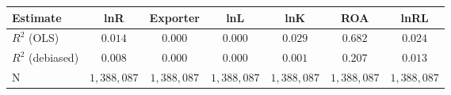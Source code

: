 \begin{tabular}{l*{6}{c}}
\hline\hline
 Estimate & lnR & Exporter & lnL & lnK & ROA & lnRL \\
\hline
\addlinespace $ R^2$ (OLS) & $0.014$ & $0.000$ & $0.000$ & $0.029$ & $0.682$ & $0.024$ \\
$ R^2$ (debiased) & $0.008$ & $0.000$ & $0.000$ & $0.001$ & $0.207$ & $0.013$ \\
N & $1,388,087$ & $1,388,087$ & $1,388,087$ & $1,388,087$ & $1,388,087$ & $1,388,087$ \\
\hline\hline
\end{tabular}
